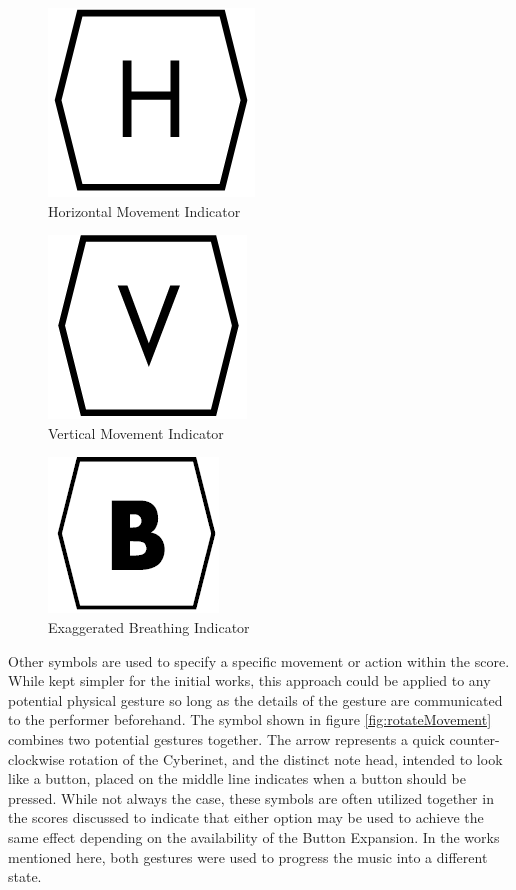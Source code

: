 \begin{figure}
    \centering
    \includegraphics{h.png}
    \caption{Horizontal Movement Indicator}
    \label{fig:horMovement}
\end{figure}


\begin{figure}
    \centering
    \includegraphics{v.png}
    \caption{Vertical Movement Indicator}
    \label{fig:vertMovement}
\end{figure}

\begin{figure}
    \centering
    \includegraphics{b.png}
    \caption{Exaggerated Breathing Indicator}
    \label{fig:breath}
\end{figure}

Other symbols are used to specify a specific movement or action within the score. While kept simpler for the initial works, this approach could be applied to any potential physical gesture so long as the details of the gesture are communicated to the performer beforehand. The symbol shown in figure \ref{fig:rotateMovement} combines two potential gestures together. The arrow represents a quick counter-clockwise rotation of the Cyberinet, and the distinct note head, intended to look like a button, placed on the middle line indicates when a button should be pressed. While not always the case, these symbols are often utilized together in the scores discussed to indicate that either option may be used to achieve the same effect depending on the availability of the Button Expansion. In the works mentioned here, both gestures were used to progress the music into a different state.

